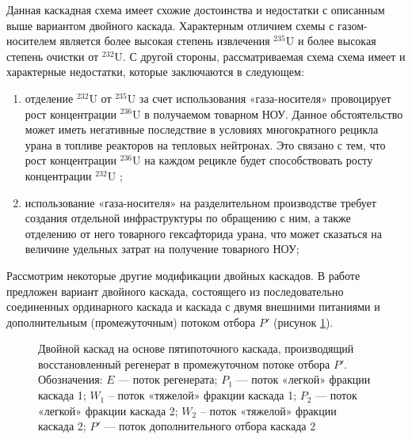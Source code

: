 Данная каскадная схема имеет схожие достоинства и недостатки с описанным выше вариантом двойного каскада. Характерным отличием схемы с газом-носителем является более высокая степень извлечения  $^{235}$U и более высокая степень очистки от $^{232}$U. С другой стороны, рассматриваемая схема схема имеет и характерные недостатки, которые заключаются в следующем:
\begin{enumerate}
  \item	отделение $^{232}$U от $^{235}$U за счет использования «газа-носителя» провоцирует рост концентрации $^{236}$U в получаемом товарном НОУ. Данное обстоятельство может иметь негативные последствие в условиях многократного рецикла урана в топливе реакторов на тепловых нейтронах. Это связано с тем, что рост концентрации $^{236}$U на каждом рецикле будет способствовать росту концентрации $^{232}$U \cite{smirnovEvolutionIsotopicComposition2012};
  \item	использование «газа-носителя» на разделительном производстве требует создания отдельной инфраструктуры по обращению с ним, а также отделению от него товарного гексафторида урана, что может сказаться на величине удельных затрат на получение товарного НОУ;
\end{enumerate}

Рассмотрим некоторые другие модификации двойных каскадов. В работе \cite{SposobIzotopnogoVosstanovleniyac} предложен вариант двойного каскада, состоящего из последовательно соединенных ординарного каскада и каскада с двумя внешними питаниями и дополнительным (промежуточным) потоком отбора $P'$ (рисунок \ref{fig:double_crazy}).

\begin{figure}[ht]
  \caption{Двойной каскад на основе пятипоточного каскада, производящий восстановленный регенерат в промежуточном потоке отбора $P'$. Обозначения: $E$ --- поток регенерата; $P_1$ --- поток «легкой» фракции каскада 1; $W_1$ – поток «тяжелой» фракции каскада 1; $P_2$ --- поток «легкой» фракции каскада 2; $W_2$ – поток «тяжелой» фракции каскада 2; $P'$ --- поток дополнительного отбора каскада 2}\label{fig:double_crazy}
\end{figure}

